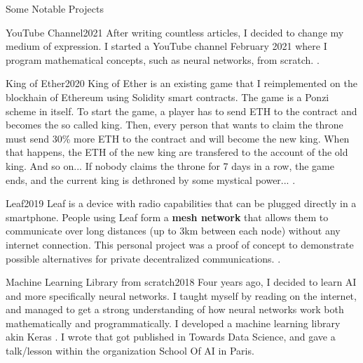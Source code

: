 \documentclass{resume}
\begin{document}
    \begin{rSection}{Some Notable Projects}
        \begin{project}{YouTube Channel}{2021}{
            After writing countless articles, I decided to change my medium of expression. I started a YouTube channel February 2021 where I program mathematical concepts, such as neural networks, from scratch. .
        }
        \end{project}

        \begin{project}{King of Ether}{2020}{
            King of Ether is an existing game that I reimplemented on the blockhain of Ethereum using Solidity smart contracts. The game is a Ponzi scheme in itself. To start the game, a player has to send ETH to the contract and becomes the so called king. Then, every person that wants to claim the throne must send 30\% more ETH to the contract and will become the new king. When that happens, the ETH of the new king are transfered to the account of the old king. And so on... If nobody claims the throne for 7 days in a row, the game ends, and the current king is dethroned by some mystical power... .
        }
        \end{project}

	    \begin{project}{Leaf}{2019}{
            Leaf is a device with radio capabilities that can be plugged directly in a smartphone. People using Leaf form a \textbf{mesh network} that allows them to communicate over long distances (up to 3km between each node) without any internet connection. This personal project was a proof of concept to demonstrate possible alternatives for private decentralized communications. .
        }
        \end{project}

        \begin{project}{Machine Learning Library from scratch}{2018}{
            Four years ago, I decided to learn AI and more specifically neural networks. I taught myself by reading on the internet, and managed to get a strong understanding of how neural networks work both mathematically and programmatically. I developed a machine learning library akin Keras \textbf{}. I wrote  that got published in Towards Data Science, and gave a talk/lesson within the organization School Of AI in Paris.
        }
        \end{project}
    \end{rSection}
\end{document}
